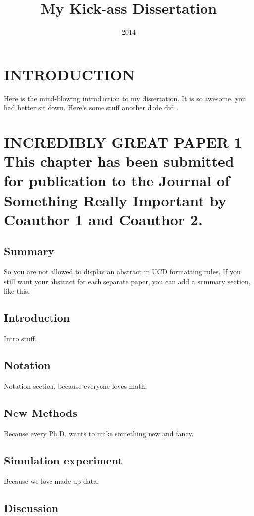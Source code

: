 \documentclass[english]{ucdenver-dissertation}
\title{My Kick-ass Dissertation}
\date{2014}
\makeatletter
\let\SF@@footnote\footnote
\def\footnote{\ifx\protect\@typeset@protect
    \expandafter\SF@@footnote
  \else
    \expandafter\SF@gobble@opt
  \fi
}
\edef\SF@gobble@opt{\noexpand\protect
  \expandafter\noexpand\csname SF@gobble@opt \endcsname}
\makeatother
\begin{document}
\chapter{INTRODUCTION}

Here is the mind-blowing introduction to my dissertation.  It is so awesome, you had better 
sit down.  Here's some stuff another dude did \citep{article_2007}.

\chapter{INCREDIBLY GREAT PAPER 1%
\footnote{This chapter has been submitted for publication to the Journal of
Something Really Important by Coauthor 1 and Coauthor 2.%
}}


\section{Summary}

So you are not allowed to display an abstract in UCD formatting rules.
If you still want your abstract for each separate paper, you can add a summary
section, like this.

\section{Introduction}

Intro stuff.

\section{Notation}

Notation section, because everyone loves math. 

\section{New Methods}

Because every Ph.D. wants to make something new and fancy.



\section{Simulation experiment}

Because we love made up data.


\section{Discussion}
\end{document}
